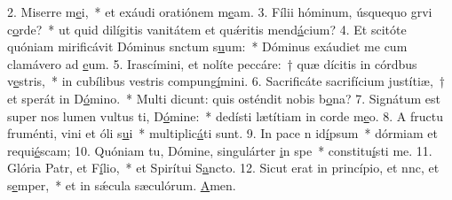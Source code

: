 2. Miserre m\uline{e}i,~* et exáudi oratiónem m\uline{e}am.
3. Fílii hóminum, úsquequo grvi c\uline{o}rde?~* ut quid dilígitis vanitátem et quǽritis mend\uline{á}cium?
4. Et scitóte quóniam mirificávit Dóminus snctum s\uline{u}um:~* Dóminus exáudiet me cum clamávero ad \uline{e}um.
5. Irascímini, et nolíte peccáre:~† quæ dícitis in córdbus v\uline{e}stris,~* in cubílibus vestris compung\uline{í}mini.
6. Sacrificáte sacrifícium justítiæ,~† et sperát in D\uline{ó}mino.~* Multi dicunt: quis osténdit nobis b\uline{o}na?
7. Signátum est super nos lumen vultus ti, D\uline{ó}mine:~* dedísti lætítiam in corde m\uline{e}o.
8. A fructu fruménti, vini et óli s\uline{u}i~* multiplic\uline{á}ti sunt.
9. In pace n id\uline{í}psum~* dórmiam et requi\uline{é}scam;
10. Quóniam tu, Dómine, singulárter \uline{i}n spe~* constitu\uline{í}sti me.
11. Glória Patr, et F\uline{í}lio,~* et Spirítui S\uline{a}ncto.
12. Sicut erat in princípio, et nnc, et s\uline{e}mper,~* et in sǽcula sæculórum. \uline{A}men.
